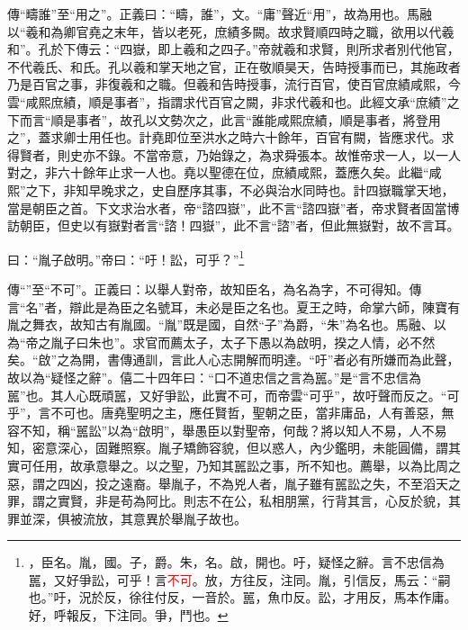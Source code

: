 {\noindent\zhuan{}\fzbyks 傳“疇誰”至“用之”。正義曰：“疇，誰”，文。“庸”聲近“用”，故為用也。馬融以“羲和為卿官堯之末年，皆以老死，庶績多闕。故求賢順四時之職，欲用以代羲和”。孔於下傳云：“四嶽，即上羲和之四子。”帝就羲和求賢，則所求者別代他官，不代羲氏、和氏。孔以羲和掌天地之官，正在敬順昊天，告時授事而已，其施政者乃是百官之事，非復羲和之職。但羲和告時授事，流行百官，使百官庶績咸熙，今雲“咸熙庶績，順是事者”，指謂求代百官之闕，非求代羲和也。此經文承“庶績”之下而言“順是事者”，故孔以文勢次之，此言“誰能咸熙庶績，順是事者，將登用之”，蓋求卿士用任也。計堯即位至洪水之時六十餘年，百官有闕，皆應求代。求得賢者，則史亦不錄。不當帝意，乃始錄之，為求舜張本。故惟帝求一人，以一人對之，非六十餘年止求一人也。堯以聖德在位，庶績咸熙，蓋應久矣。此繼“咸熙”之下，非知早晚求之，史自歷序其事，不必與治水同時也。計四嶽職掌天地，當是朝臣之首。下文求治水者，帝“諮四嶽”，此不言“諮四嶽”者，帝求賢者固當博訪朝臣，但史以有嶽對者言“諮！四嶽”，此不言“諮”者，但此無嶽對，故不言耳。 \par}

曰：“胤子啟明。”帝曰：“吁！訟，可乎？”\footnote{\textcolor{red}{}，臣名。胤，國。子，爵。朱，名。啟，開也。吁，疑怪之辭。言不忠信為嚚，又好爭訟，可乎！言\textcolor{red}{不可}。放，方往反，注同。胤，引信反，馬云：“嗣也。”吁，況於反，徐往付反，一音於。嚚，魚巾反。訟，才用反，馬本作庸。好，呼報反，下注同。爭，鬥也。}

{\noindent\zhuan{}\fzbyks 傳“”至“不可”。正義曰：以舉人對帝，故知臣名，為名為字，不可得知。傳言“名”者，辯此是為臣之名號耳，未必是臣之名也。夏王之時，命掌六師，陳寶有胤之舞衣，故知古有胤國。“胤”既是國，自然“子”為爵，“朱”為名也。馬融、以為“帝之胤子曰朱也”。求官而薦太子，太子下愚以為啟明，揆之人情，必不然矣。“啟”之為開，書傳通訓，言此人心志開解而明達。“吁”者必有所嫌而為此聲，故以為“疑怪之辭”。僖二十四年曰：“口不道忠信之言為嚚。”是“言不忠信為嚚”也。其人心既頑嚚，又好爭訟，此實不可，而帝雲“可乎”，故吁聲而反之。“可乎”，言不可也。唐堯聖明之主，應任賢哲，聖朝之臣，當非庸品，人有善惡，無容不知，稱“嚚訟”以為“啟明”，舉愚臣以對聖帝，何哉？將以知人不易，人不易知，密意深心，固難照察。胤子矯飾容貌，但以惑人，內少鑑明，未能圓備，謂其實可任用，故承意舉之。以之聖，乃知其嚚訟之事，所不知也。薦舉，以為比周之惡，謂之四凶，投之遠裔。舉胤子，不為兇人者，胤子雖有嚚訟之失，不至滔天之罪，謂之實賢，非是苟為阿比。則志不在公，私相朋黨，行背其言，心反於貌，其罪並深，俱被流放，其意異於舉胤子故也。 \par}

